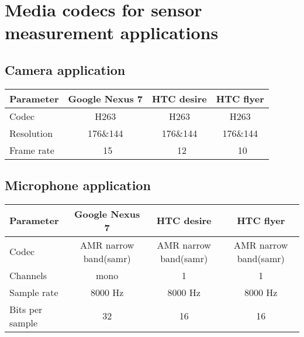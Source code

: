 \section{Media codecs for sensor measurement applications}
\subsection{Camera application}	

\begin{table}[H]
	\centering
    \begin{tabular}{| l | c | c | c |}
    \hline
    Parameter & Google Nexus 7 & HTC desire & HTC flyer\\ \hline
    Codec                  & H263 & H263 & H263 \\ \hline
    Resolution          & 176\&144 & 176\&144 & 176\&144 \\ \hline
    Frame rate & ~15 & ~12 & ~10 \\ \hline
    \end{tabular}
\end{table}				
					
\subsection{Microphone application}		
			
\begin{table}[H]
	\centering
    \begin{tabular}{| l | c | c | c |}
    \hline
    Parameter & Google Nexus 7 & HTC desire & HTC flyer \\ \hline
    Codec                  & AMR narrow band(samr) & AMR narrow band(samr) & AMR narrow band(samr) \\ \hline
    Channels          & mono & 1 & 1 \\ \hline
    Sample rate          & 8000 Hz & 8000 Hz & 8000 Hz \\ \hline
    Bits per sample & 32 & 16 & 16 \\ \hline
    \end{tabular}
\end{table}	